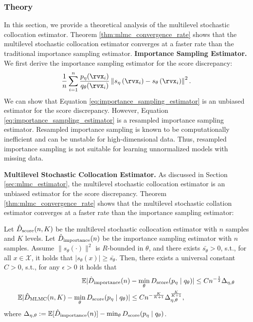 \documentclass{article} %
\begin{document}
\subsubsection{Theory}
\label{sec:theory}
In this section, we provide a theoretical analysis of the multilevel stochastic collocation estimator. Theorem \ref{thm:mlmc_convergence_rate} shows that the multilevel stochastic collocation estimator converges at a faster rate than the traditional importance sampling estimator.
\textbf{Importance Sampling Estimator.} We first derive the importance sampling estimator for the score discrepancy:
\begin{align}
	\frac{1}{n} \sum_{i=1}^{n} \frac{p_{\eta}(\rvx_{i})}{q_{\theta}(\rvx_{i})}  \left\| s_{\eta} \left( \rvx_{i} \right) - s_{\theta} \left( \rvx_{i} \right) \right\|^{2}. \label{eq:importance_sampling_estimator}
\end{align}
We can show that Equation \eqref{eq:importance_sampling_estimator} is an unbiased estimator for the score discrepancy. However, Equation \eqref{eq:importance_sampling_estimator} is a resampled importance sampling estimator. Resampled importance sampling is known to be computationally inefficient and can be unstable for high-dimensional data. Thus, resampled importance sampling is not suitable for learning unnormalized models with missing data.

\textbf{Multilevel Stochastic Collocation Estimator.} As discussed in Section \ref{sec:mlmc_estimator}, the multilevel stochastic collocation estimator is an unbiased estimator for the score discrepancy. Theorem \ref{thm:mlmc_convergence_rate} shows that the multilevel stochastic collation estimator converges at a faster rate than the importance sampling estimator:
\begin{theorem}%
	\label{thm:mlmc_convergence_rate}
	Let $\hat{D}_{\text{\rm{score}}}(n, K)$ be the multilevel stochastic collocation estimator with $n$ samples and $K$ levels. Let $\hat{D}_{\text{\rm{importance}}}(n)$ be the importance sampling estimator with $n$ samples. Assume $\| s_{\theta}(\cdot)\|^{2}$ is $R$-bounded in $\theta$, and there exists $\bar{s_{\theta}} > 0$, s.t., for all $x \in \mathcal{X}$, it holds that $|s_{\theta}(x)|\geq \bar{s_{\theta}}$. Then, there exists a universal constant $C>0$, s.t., for any $\epsilon > 0$ it holds that
	\begin{align*}
		\mathbb{E}|\hat{D}_{\text{\rm{importance}}}(n) &-\min_{\theta} D_{\text{\rm{score}}}(p_{\eta} \mid q_{\theta})| \leq C n^{-\frac{1}{2}} \Delta_{\eta,\theta} \\
		\mathbb{E}|\hat{D}_{\text{\rm{MLMC}}}(n,K) - \min_{\theta} D_{\text{\rm{score}}}(p_{\eta} \mid q_{\theta})| &\leq C n^{-\frac{K}{K+1}} \Delta_{\eta,\theta}^{\frac{K}{K+1}},
	\end{align*}
	where $\Delta_{\eta,\theta}:= \mathbb{E}[\hat{D}_{\text{\rm{importance}}}(n)] - \min_{\theta} D_{\text{\rm{score}}}(p_{\eta} \mid q_{\theta})$. 
\end{theorem}
\end{document}
